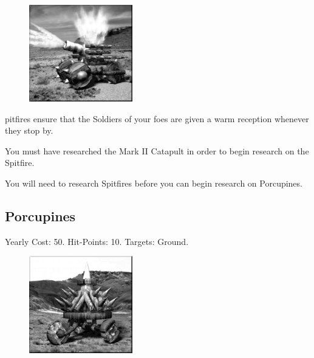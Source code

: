 \begin{figure}
	\vspace{-20pt}
	\begin{center}
		\includegraphics[width=0.4\textwidth]{Aspitfire}
	\end{center}
\end{figure}

pitfires ensure that the Soldiers of your foes are given a warm reception whenever they stop by.

You must have researched the Mark II Catapult in order to begin research on the Spitfire. 

You will need to research Spitfires before you can begin research on Porcupines.

\clearpage

\subsection{Porcupines}


\begin{center}
Yearly Cost: 50. Hit-Points: 10. Targets: Ground.
\end{center}

\begin{figure}
	\vspace{-20pt}
	\begin{center}
		\includegraphics[width=0.4\textwidth]{Aporcupine}
	\end{center}
\end{figure}

